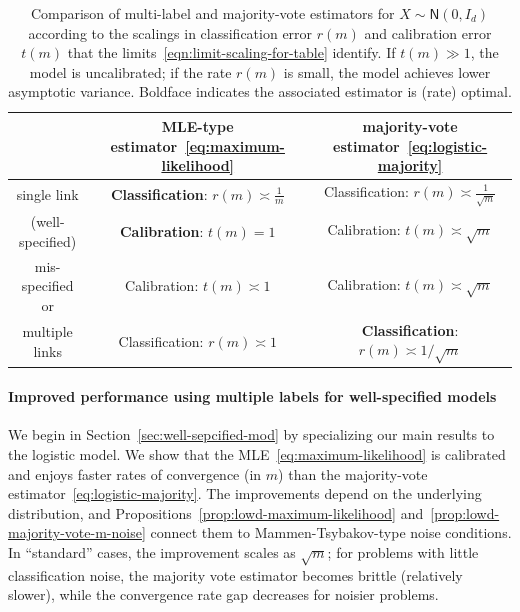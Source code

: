 \documentclass[11pt]{article}
\newcommand{\normal}{\mathsf{N}}
\newcommand{\<}{\langle} %
\renewcommand{\>}{\rangle}
\begin{document}
\begin{table}
  \centering
  \begin{tabular}{c|c|c}
    \toprule 
    & MLE-type estimator~\eqref{eq:maximum-likelihood}
    & majority-vote estimator~\eqref{eq:logistic-majority} \\
    \hline
    single link
    & \textbf{Classification}:
    $r(m) \asymp \frac{1}{m}$
    & Classification: $r(m) \asymp \frac{1}{\sqrt{m}}$ \\
    (well-specified) & \textbf{Calibration}:
    $t(m) = 1$ &
    Calibration: $t(m) \asymp \sqrt{m}$ \\ 
    \hline
    mis-specified or
    & Calibration: $t(m) \asymp 1$ &  Calibration: $t(m) \asymp \sqrt{m}$  \\ 
    multiple links & Classification: $r(m) \asymp 1$ &
    \textbf{Classification}: $r(m) \asymp 1 / \sqrt{m}$
    \\
    \hline
  \end{tabular}
  \caption{
    Comparison of multi-label and majority-vote estimators
    for $X \sim \normal(0, I_d)$
    according to the scalings in classification error
    $r(m)$ and calibration error $t(m)$ that
    the limits~\eqref{eqn:limit-scaling-for-table} identify.
    If $t(m) \gg 1$, the model is uncalibrated; if the rate $r(m)$ is small,
    the model achieves lower asymptotic variance.
    Boldface indicates the associated estimator
    is (rate) optimal. \label{table:comparisons}}
\end{table}


\paragraph{Improved performance using multiple labels for well-specified models}
We begin in Section~\ref{sec:well-sepcified-mod} by specializing our main
results to the logistic model.
%
We show that the MLE~\eqref{eq:maximum-likelihood} is
calibrated and enjoys faster rates of convergence (in $m$) than the
majority-vote estimator~\eqref{eq:logistic-majority}.
%
The improvements depend on the underlying distribution, and
Propositions~\ref{prop:lowd-maximum-likelihood}
and~\ref{prop:lowd-majority-vote-m-noise} connect them to
Mammen-Tsybakov-type noise conditions.
%
In ``standard'' cases, the improvement scales as
$\sqrt{m}$; for problems with little classification noise, the majority vote
estimator becomes brittle (relatively slower), while the convergence rate
gap decreases for noisier problems.
\end{document}
